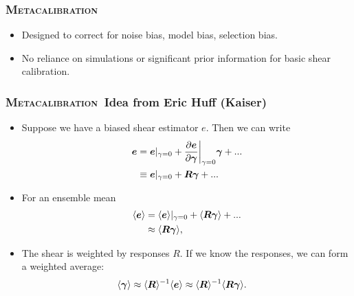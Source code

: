 \documentclass{beamer}
\newcommand{\Mcal}{\textsc{Metacalibration}}
\newcommand{\mcalR}{\mbox{\boldmath $R$}}
\newcommand{\vecg}{\mbox{\boldmath $\gamma$}}
\newcommand{\vest}{\mbox{\boldmath $e$}}
\begin{document}
\frame
{
    \frametitle{\Mcal}

 
 \begin{itemize}
     \item Designed to correct for noise bias, model bias, selection bias.
     \item No reliance on simulations or significant prior information
         for basic shear calibration.
 \end{itemize}

}

\frame
{
    \frametitle{\Mcal\ Idea from Eric Huff (Kaiser)}

 
    \begin{itemize}

        \item Suppose we have a biased shear estimator {\color{gold} \vest}.  Then we can write
            {\color{gold}
\begin{align} \label{eq:Eexpand}
    \vest &= \vest|_{\gamma=0} + \frac{ \partial \vest }{ \partial \vecg}\bigg|_{\gamma=0} \vecg  + ... \nonumber \\
          &\equiv \vest|_{\gamma=0} + \mbox{\mcalR}\vecg  + ...
\end{align}
            } 

        \item For an ensemble mean
            {\color{gold}
                \begin{align}
                    \langle \vest \rangle &= \langle \vest \rangle |_{\gamma=0} + \langle \mbox{\mcalR} \vecg \rangle + ... \nonumber \\
                                          &\approx \langle \mbox{\mcalR} \vecg \rangle,
                \end{align}
                }

            \item The shear is weighted by responses {\color{cadetblue} \mcalR}.  If we know the
                responses, we can form a weighted average:
            {\color{gold}
\begin{align} \label{eq:rcorr}
    \langle \vecg \rangle &\approx \langle \mbox{\mcalR} \rangle^{-1}  \langle \vest \rangle \approx \langle \mbox{\mcalR} \rangle^{-1} \langle \mcalR \vecg \rangle.
\end{align}
            }
    \end{itemize}
}
\end{document}

